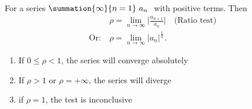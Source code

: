 \documentclass{report}
\title{\Huge{}}
\author{\huge{Nathan Warner}}
\date{\huge{}}
\begin{document}
    \begin{remark}
       For a series $\summation{\infty}{n=1}\ a_{n}\ $ with positive terms. Then
       \begin{align*}
           &\rho = \lim\limits_{n \to \infty}{\bigg\lvert \frac{a_{n+1}}{a_{n}} \bigg\rvert} \quad \text{(Ratio test)} \\
           \text{Or:}\ &\rho = \lim\limits_{n \to \infty}{\lvert a_{n}\rvert^{\frac{1}{n}}} 
       .\end{align*}
       \begin{enumerate}[label=\roman*.]
            \item If $0 \leq \rho < 1 $, the series will converge absolutely
            \item If $\rho > 1$ or $\rho = +\infty$, the series will diverge
            \item if $\rho  = 1$, the test is inconclusive
       \end{enumerate}
    \end{remark}
\end{document}
